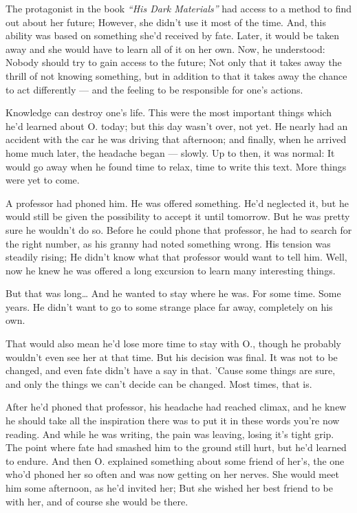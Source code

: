 The protagonist in the book \emph{\enquote{His Dark Materials}} had access to a method to find out about her future; However, she didn't use it most of the time. 
And, this ability was based on something she'd received by fate. Later, it would be taken away and she would have to learn all of it on her own. 
Now, he understood: Nobody should try to gain access to the future; Not only that it takes away the thrill of not knowing something, but in addition to that it takes away the chance to act differently --- and the feeling to be responsible for one's actions.

Knowledge can destroy one's life. 
This were the most important things which he'd learned about O. today; but this day wasn't over, not yet. 
He nearly had an accident with the car he was driving that afternoon; and finally, when he arrived home much later, the headache began --- slowly. 
Up to then, it was normal: It would go away when he found time to relax, time to write this text. 
More things were yet to come.

A professor had phoned him. 
He was offered something. 
He'd neglected it, but he would still be given the possibility to accept it until tomorrow. 
But he was pretty sure he wouldn't do so. 
Before he could phone that professor, he had to search for the right number, as his granny had noted something wrong. 
His tension was steadily rising; He didn't know what that professor would want to tell him. 
Well, now he knew he was offered a long excursion to learn many interesting things.

But that was long\dots{}
And he wanted to stay where he was. 
For some time. 
Some years. 
He didn't want to go to some strange place far away, completely on his own.

That would also mean he'd lose more time to stay with O., though he probably wouldn't even see her at that time. 
But his decision was final. 
It was not to be changed, and even fate didn't have a say in that.
'Cause some things are sure, and only the things we can't decide can be changed. 
Most times, that is.

After he'd phoned that professor, his headache had reached climax, and he knew he should take all the inspiration there was to put it in these words you're now reading. 
And while he was writing, the pain was leaving, losing it's tight grip.
The point where fate had smashed him to the ground still hurt, but he'd learned to endure. 
And then O. explained something about some friend of her's, the one who'd phoned her so often and was now getting on her nerves. 
She would meet him some afternoon, as he'd invited her; But she wished her best friend to be with her, and of course she would be there.

